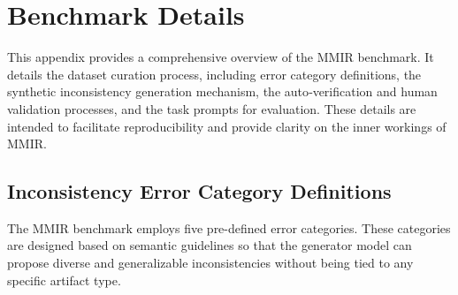 \section{Benchmark Details}
This appendix provides a comprehensive overview of the MMIR benchmark. It details the dataset curation process, including error category definitions, the synthetic inconsistency generation mechanism, the auto‐verification and human validation processes, and the task prompts for evaluation. These details are intended to facilitate reproducibility and provide clarity on the inner workings of MMIR.

\subsection{Inconsistency Error Category Definitions}
\label{appendix:sec:error category}

The MMIR benchmark employs five pre-defined error categories. These categories are designed based on semantic guidelines so that the generator model can propose diverse and generalizable inconsistencies without being tied to any specific artifact type.

